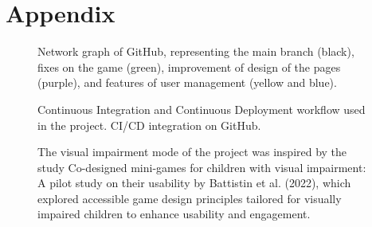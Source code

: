 
\chapter{Appendix}
\begin{appendices}

    \begin{figure}[H]
        \caption*{Network graph of GitHub, representing the main branch (black), fixes on the game (green), improvement of design of the pages (purple), and features of user management (yellow and blue).}
        \label{fig:network-grahp}
    \end{figure}
    \begin{figure}[H]
        \caption*{Continuous Integration and Continuous Deployment workflow used in the project. CI/CD integration on GitHub.}
        \label{fig:ci-cd}
    \end{figure}
    \begin{figure}[H]
        \caption*{The visual impairment mode of the project was inspired by the study Co-designed mini-games for children with visual impairment: A pilot study on their usability by Battistin et al. (2022), which explored accessible game design principles tailored for visually impaired children to enhance usability and engagement.}
        \label{fig:impairment}
    \end{figure}
\end{appendices}